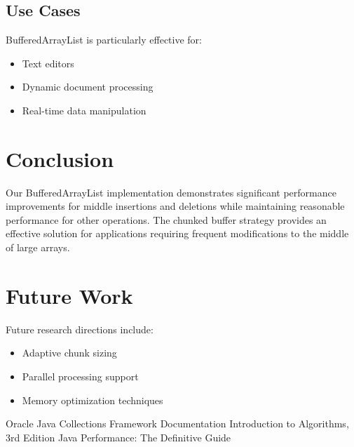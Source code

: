 \documentclass[twocolumn]{article}
\begin{document}
\subsection{Use Cases}
BufferedArrayList is particularly effective for:
\begin{itemize}
    \item Text editors
    \item Dynamic document processing
    \item Real-time data manipulation
\end{itemize}

\section{Conclusion}
Our BufferedArrayList implementation demonstrates significant performance improvements for middle insertions and deletions while maintaining reasonable performance for other operations. The chunked buffer strategy provides an effective solution for applications requiring frequent modifications to the middle of large arrays.

\section{Future Work}
Future research directions include:
\begin{itemize}
    \item Adaptive chunk sizing
    \item Parallel processing support
    \item Memory optimization techniques
\end{itemize}

\begin{thebibliography}{9}
 Oracle Java Collections Framework Documentation
 Introduction to Algorithms, 3rd Edition
 Java Performance: The Definitive Guide
\end{thebibliography}
\end{document}
